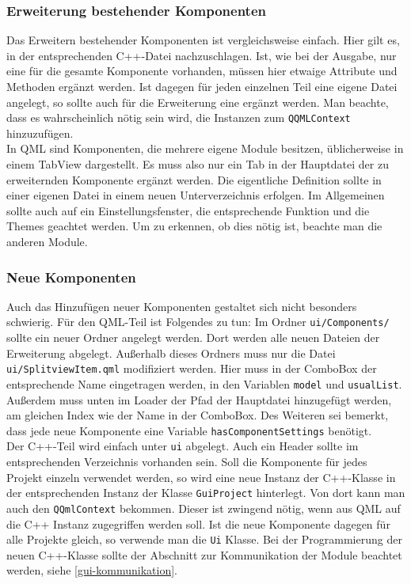 \subsubsection{Erweiterung bestehender Komponenten}
Das Erweitern bestehender Komponenten ist vergleichsweise einfach. Hier gilt es,
in der entsprechenden C++-Datei nachzuschlagen. Ist, wie bei der Ausgabe, nur
eine für die gesamte Komponente vorhanden, müssen hier etwaige Attribute und
Methoden ergänzt werden. Ist dagegen für jeden einzelnen Teil eine eigene Datei
angelegt, so sollte auch für die Erweiterung eine ergänzt werden. Man beachte,
dass es wahrscheinlich nötig sein wird, die Instanzen zum \texttt{QQMLContext}
hinzuzufügen.\\
In QML sind Komponenten, die mehrere eigene Module besitzen, üblicherweise in
einem TabView dargestellt. Es muss also nur ein Tab in der Hauptdatei der zu
erweiternden Komponente ergänzt werden. Die eigentliche Definition sollte in
einer eigenen Datei in einem neuen Unterverzeichnis erfolgen. Im Allgemeinen
sollte auch auf ein Einstellungsfenster, die entsprechende Funktion und die
Themes geachtet werden. Um zu erkennen, ob dies nötig ist, beachte man die
anderen Module.

\subsubsection{Neue Komponenten}

Auch das Hinzufügen neuer Komponenten gestaltet sich nicht besonders schwierig.
Für den QML-Teil ist Folgendes zu tun: Im Ordner \texttt{ui/Components/} sollte ein
neuer Ordner angelegt werden. Dort werden alle neuen Dateien der Erweiterung
abgelegt. Außerhalb dieses Ordners muss nur die Datei
\texttt{ui/SplitviewItem.qml} modifiziert werden. Hier muss in der ComboBox der
entsprechende Name eingetragen werden, in den Variablen \texttt{model} und
\texttt{usualList}. Außerdem muss unten im Loader der Pfad der Hauptdatei
hinzugefügt werden, am gleichen Index wie der Name in der ComboBox. Des Weiteren
sei bemerkt, dass jede neue Komponente eine Variable
\texttt{hasComponentSettings} benötigt.\\
Der C++-Teil wird einfach unter \texttt{ui} abgelegt. Auch ein Header sollte im
entsprechenden Verzeichnis vorhanden sein. Soll die Komponente für jedes Projekt
einzeln verwendet werden, so wird eine neue Instanz der C++-Klasse in der
entsprechenden Instanz der Klasse \texttt{GuiProject} hinterlegt. Von dort kann
man auch den \texttt{QQmlContext} bekommen. Dieser ist zwingend nötig, wenn aus
QML auf die C++ Instanz zugegriffen werden soll. Ist die neue Komponente dagegen
für alle Projekte gleich, so verwende man die \texttt{Ui} Klasse. Bei der
Programmierung der neuen C++-Klasse sollte der Abschnitt zur Kommunikation der
Module beachtet werden, siehe \autoref{gui-kommunikation}.

